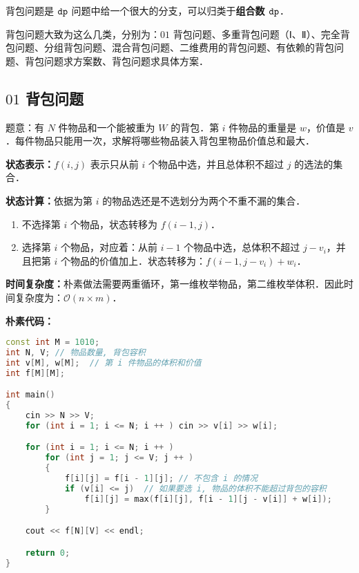 
背包问题是 $\tt dp$ 问题中给一个很大的分支，可以归类于\textbf{组合数 $\tt dp$}．

背包问题大致为这么几类，分别为：$01$ 背包问题、多重背包问题（Ⅰ、Ⅱ）、完全背包问题、分组背包问题、混合背包问题、二维费用的背包问题、有依赖的背包问题、背包问题求方案数、背包问题求具体方案．

\subsection{$01$ 背包问题}

题意：有 $N$ 件物品和一个能被重为 $W$ 的背包．第 $i$ 件物品的重量是 $w$，价值是 $v$ ．每件物品只能用一次，求解将哪些物品装入背包里物品价值总和最大．

\textbf{状态表示：}$f(i, j)$ 表示只从前 $i$ 个物品中选，并且总体积不超过 $j$ 的选法的集合．

\textbf{
状态计算：}依据为第 $i$ 的物品选还是不选划分为两个不重不漏的集合．

\begin{enumerate}
\item 不选择第 $i$ 个物品，状态转移为 $f(i - 1, j)$．
\item 选择第 $i$ 个物品，对应着：从前 $i - 1$ 个物品中选，总体积不超过 $j - v_i$，并且把第 $i$ 个物品的价值加上．状态转移为：$f(i - 1, j - v_i) + w_i$．
\end{enumerate}

\textbf{时间复杂度：}朴素做法需要两重循环，第一维枚举物品，第二维枚举体积．因此时间复杂度为：$\mathcal{O}(n \times m)$．

\textbf{朴素代码：}

\begin{lstlisting}[language=cpp]
const int M = 1010;
int N, V; // 物品数量, 背包容积
int v[M], w[M];  // 第 i 件物品的体积和价值
int f[M][M];

int main()
{
    cin >> N >> V;
    for (int i = 1; i <= N; i ++ ) cin >> v[i] >> w[i];

    for (int i = 1; i <= N; i ++ )
        for (int j = 1; j <= V; j ++ )
        {
            f[i][j] = f[i - 1][j]; // 不包含 i 的情况
            if (v[i] <= j)  // 如果要选 i, 物品的体积不能超过背包的容积
                f[i][j] = max(f[i][j], f[i - 1][j - v[i]] + w[i]);
        }

    cout << f[N][V] << endl;

    return 0;
}
\end{lstlisting}

